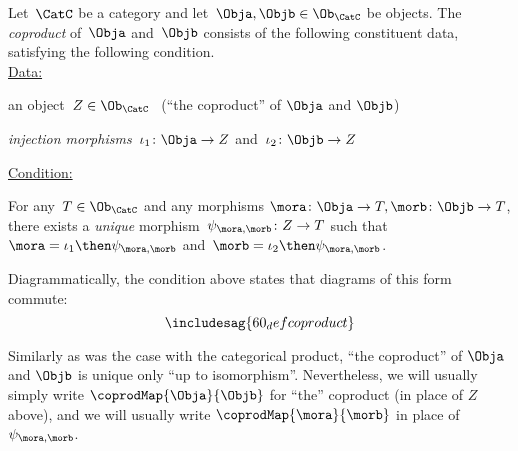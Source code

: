 \begin{ctdefinition}[Coproduct]
\label{def:catcoproduct}
Let~$\CatC$ be a category and let~$\Obja, \Objb \in \Ob_{\CatC}$ be objects. The \emph{coproduct} of~$\Obja$ and~$\Objb$ consists of the following constituent data, satisfying the following condition. \\
\underline{Data:}
\begin{compactenum}
\item an object~$Z \in \Ob_{\CatC}$ \ (``the coproduct'' of $\Obja$ and $\Objb$)
\item \emph{injection morphisms}~$\iota_1 \colon \Obja \to Z $ and~$\iota_2 \colon \Objb \to Z$
\end{compactenum}
\underline{Condition:}
\begin{compactenum}
\item For any~$T \in \Ob_{\CatC}$ and any morphisms $\mora \colon  \Obja \to T, \morb \colon \Objb \to T$, there exists a \emph{unique} morphism~$\psi_{\mora, \morb} \colon Z \to T$ such that~$\mora = \iota_1\then \psi_{\mora, \morb}$ and~$\morb = \iota_2 \then \psi_{\mora,\morb}$.
\end{compactenum}
\end{ctdefinition}


\begin{remark}
Diagrammatically, the condition above states that diagrams of this form commute:
\begin{equation}
\includesag{60_defcoproduct}
\end{equation}
\end{remark}

\begin{remark}
Similarly as was the case with the categorical product, ``the coproduct'' of $\Obja$ and $\Objb$ is unique only ``up to isomorphism''. Nevertheless, we will usually simply write $\coprodMap{\Obja}{\Objb}$ for ``the'' coproduct (in place of $Z$ above), and we will usually write $\coprodMap{\mora}{\morb}$ in place of $\psi_{\mora, \morb}$.
\end{remark}

%
%


%


